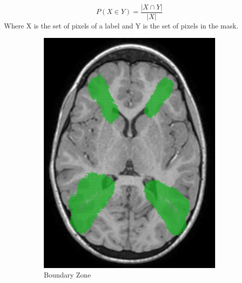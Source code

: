 \documentclass{standalone}
\begin{document}
\begin{equation}\label{eq:probability_boundary_mask}
    P(X \in Y) = \frac{|X \cap Y|}{|X|}
\end{equation}
Where X is the set of pixels of a label and Y is the set of pixels in the mask.

\begin{figure}[h!]
		\centering
        \begin{subfigure}[b]{0.49\textwidth}
        \centering
             \includegraphics[scale=0.18]{img/Chap2/boundary.jpg}
             \caption{Boundary Zone} \label{fig:boundary}
        \end{subfigure}
        \hfill
        \begin{subfigure}[b]{0.49\textwidth}
        \centering

\end{subfigure}
\end{figure}
\end{document}
